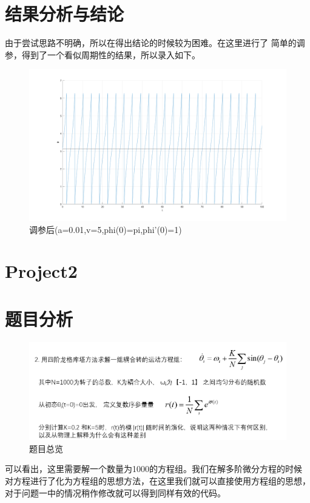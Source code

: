 \documentclass[UTF8,a4paper,10pt]{ctexart}
\begin{document}
\section{结果分析与结论}
由于尝试思路不明确，所以在得出结论的时候较为困难。在这里进行了
简单的调参，得到了一个看似周期性的结果，所以录入如下。
	\begin{figure}[!htbp]
		\centering
		\includegraphics[width=1\textwidth,height=0.75\textwidth]{pictures/p1.png}
		\caption{调参后(a=0.01,v=5,phi(0)=pi,phi'(0)=1)} \label{p1}
	\end{figure}

\section*{Project2}
\section{题目分析}
\begin{figure}[!htbp]
  \centering
  \includegraphics[width=1\textwidth,height=0.2\textwidth]{pictures/project2.png}
  \caption{题目总览} \label{project2}
\end{figure}
可以看出，这里需要解一个数量为1000的方程组。我们在解多阶微分方程的时候
对方程进行了化为方程组的思想方法，在这里我们就可以直接使用方程组的思想，
对于问题一中的情况稍作修改就可以得到同样有效的代码。\newline
\end{document}
